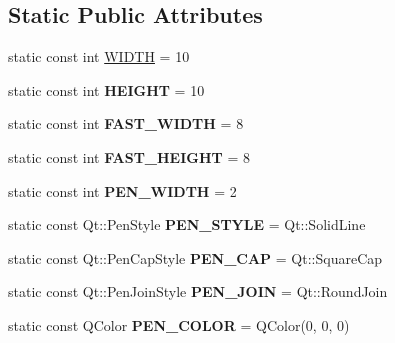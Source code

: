 \subsection*{Static Public Attributes}
\begin{DoxyCompactItemize}
\item 
static const int \hyperlink{classCarGUI_a8d29447aca5b3c2e336aa65e95299e88}{W\-I\-D\-T\-H} = 10
\item 
\hypertarget{classCarGUI_aeca3f99b8146192a515ee78f787c3f9f}{static const int {\bfseries H\-E\-I\-G\-H\-T} = 10}\label{classCarGUI_aeca3f99b8146192a515ee78f787c3f9f}

\item 
\hypertarget{classCarGUI_abf7ae31a3d62b7ab4d76c21de1411c67}{static const int {\bfseries F\-A\-S\-T\-\_\-\-W\-I\-D\-T\-H} = 8}\label{classCarGUI_abf7ae31a3d62b7ab4d76c21de1411c67}

\item 
\hypertarget{classCarGUI_afd43e7040ed20f1d4ef5e1fc5bdf59d1}{static const int {\bfseries F\-A\-S\-T\-\_\-\-H\-E\-I\-G\-H\-T} = 8}\label{classCarGUI_afd43e7040ed20f1d4ef5e1fc5bdf59d1}

\item 
\hypertarget{classCarGUI_af56d7d01bc54b16ff78cc14cce570e10}{static const int {\bfseries P\-E\-N\-\_\-\-W\-I\-D\-T\-H} = 2}\label{classCarGUI_af56d7d01bc54b16ff78cc14cce570e10}

\item 
\hypertarget{classCarGUI_af14734c0d3a169cccf2ceca579201619}{static const Qt\-::\-Pen\-Style {\bfseries P\-E\-N\-\_\-\-S\-T\-Y\-L\-E} = Qt\-::\-Solid\-Line}\label{classCarGUI_af14734c0d3a169cccf2ceca579201619}

\item 
\hypertarget{classCarGUI_a8fc5e937a0c580cad858385de115b945}{static const Qt\-::\-Pen\-Cap\-Style {\bfseries P\-E\-N\-\_\-\-C\-A\-P} = Qt\-::\-Square\-Cap}\label{classCarGUI_a8fc5e937a0c580cad858385de115b945}

\item 
\hypertarget{classCarGUI_acb7a588f4fa762490d23d56324047b93}{static const Qt\-::\-Pen\-Join\-Style {\bfseries P\-E\-N\-\_\-\-J\-O\-I\-N} = Qt\-::\-Round\-Join}\label{classCarGUI_acb7a588f4fa762490d23d56324047b93}

\item 
\hypertarget{classCarGUI_afe262af5aff70256e0c4d3c5c2f6e48f}{static const Q\-Color {\bfseries P\-E\-N\-\_\-\-C\-O\-L\-O\-R} = Q\-Color(0, 0, 0)}\label{classCarGUI_afe262af5aff70256e0c4d3c5c2f6e48f}


\end{DoxyCompactItemize}
